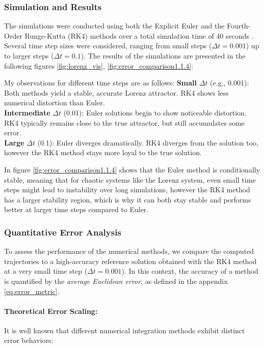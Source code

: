\subsubsection{Simulation and Results}
The simulations were conducted using both the Explicit Euler and the Fourth-Order Runge-Kutta (RK4) methods over a total simulation time of 40 seconds \cite{youngaryanLorenzPlot1.1.4}. Several time step sizes were considered, ranging from small steps ($\Delta t = 0.001$) up to larger steps ($\Delta t = 0.1$). The results of the simulations are presented in the following figures \ref{fig:lorenz_vis}, \ref{fig:error_comparison1.1.4}:


My observations for different time steps are as follows:
\textbf{Small} $\Delta t$ (e.g., 0.001): Both methods yield a stable, accurate Lorenz attractor. RK4 shows less numerical distortion than Euler.\\

\textbf{Intermediate} $\Delta t$ (0.01): Euler solutions begin to show noticeable distortion. RK4 typically remains close to the true attractor, but still accumulates some error.\\

\textbf{Large} $\Delta t$ (0.1): Euler diverges dramatically. RK4 diverges from the solution too, however the RK4 method stays more loyal to the true solution.

In figure \ref{fig:error_comparison1.1.4} shows that the Euler method is conditionally stable, meaning that for chaotic systems like the Lorenz system, even small time steps might lead to instability over long simulations, however the RK4 method has a larger stability region, which is why it can both stay stable and performs better at larger time steps compared to Euler.

\subsubsection{Quantitative Error Analysis}

To assess the performance of the numerical methods, we compare the computed trajectories to a high-accuracy reference solution obtained with the RK4 method at a very small time step (\(\Delta t = 0.001\)). In this context, the accuracy of a method is quantified by the \emph{average Euclidean error}, as defined in the appendix \ref{eq:error_metric}.


\paragraph{Theoretical Error Scaling:}
It is well known that different numerical integration methods exhibit distinct error behaviors:

